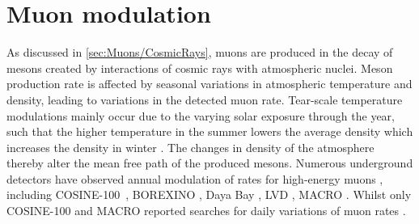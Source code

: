 \section{Muon modulation}\label{sec:Muons/MuonModulation}
As discussed in \autoref{sec:Muons/CosmicRays}, muons are produced in the decay of mesons created by interactions of cosmic rays with atmospheric nuclei. Meson production rate is affected by seasonal variations in atmospheric temperature and density, leading to variations in the detected muon rate. Tear-scale temperature modulations mainly occur due to the varying solar exposure
through the year, such that the higher temperature in the summer lowers the average density
which increases the density in winter \cite{COSINE-100:2020jml}. The changes in density of the atmosphere thereby alter the mean free path of the produced mesons. Numerous underground detectors have observed annual modulation of rates for high-energy muons \cite{Gaisser_Engel_Resconi_2016}, including COSINE-100~\cite{COSINE-100:2020jml}, BOREXINO \cite{Borexino:2018pev}, Daya Bay \cite{DayaBay:2017lpf}, LVD \cite{PhysRevD.58.092005}, MACRO \cite{AMBROSIO1997109}. Whilst only COSINE-100 and MACRO reported searches for daily variations of muon rates \cite{COSINE-100:2020jml,AMBROSIO1997109}.

